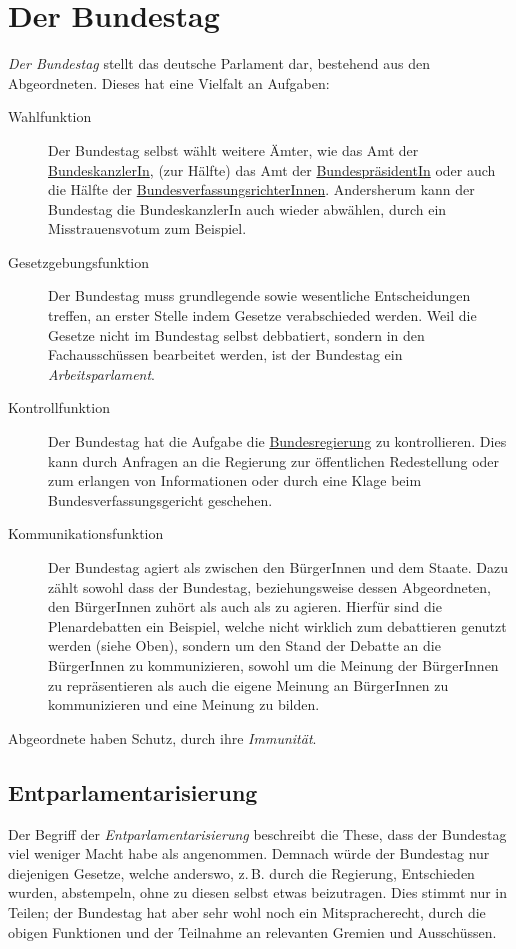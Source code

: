 \documentclass{article}
\begin{document}
\section{Der Bundestag}
\emph{Der Bundestag} stellt das deutsche Parlament dar, bestehend aus den Abgeordneten. Dieses hat eine Vielfalt an Aufgaben:
\begin{description}
 \item[Wahlfunktion] Der Bundestag selbst wählt weitere Ämter, wie das Amt der \hyperref[Die BundeskanzlerIn]{BundeskanzlerIn}, (zur Hälfte) das Amt der \hyperref[Die BundespräsidentIn]{BundespräsidentIn} oder auch die Hälfte der \hyperref[Das Bundesverfassungsgericht]{BundesverfassungsrichterInnen}. Andersherum kann der Bundestag die BundeskanzlerIn auch wieder abwählen, durch ein Misstrauensvotum zum Beispiel.
 \item[Gesetzgebungsfunktion] Der Bundestag muss grundlegende sowie wesentliche Entscheidungen treffen, an erster Stelle indem Gesetze verabschieded werden. Weil die Gesetze nicht im Bundestag selbst debbatiert, sondern in den Fachausschüssen bearbeitet werden, ist der Bundestag ein \emph{Arbeitsparlament}.
 \item[Kontrollfunktion] Der Bundestag hat die Aufgabe die \hyperref[Die Bundesregierung]{Bundesregierung} zu kontrollieren. Dies kann durch Anfragen an die Regierung zur öffentlichen Redestellung oder zum erlangen von Informationen oder durch eine Klage beim Bundesverfassungsgericht geschehen.
 \item[Kommunikationsfunktion] Der Bundestag agiert als  zwischen den BürgerInnen und dem Staate. Dazu zählt sowohl dass der Bundestag, beziehungsweise dessen Abgeordneten, den BürgerInnen zuhört als auch als  zu agieren. Hierfür sind die Plenardebatten ein Beispiel, welche nicht wirklich zum debattieren genutzt werden (siehe Oben), sondern um den Stand der Debatte an die BürgerInnen zu kommunizieren, sowohl um die Meinung der BürgerInnen zu repräsentieren als auch die eigene Meinung an BürgerInnen zu kommunizieren und eine Meinung zu bilden.
\end{description} 
 
Abgeordnete haben Schutz, durch ihre \emph{Immunität}.
 
\subsection{Entparlamentarisierung} 
Der Begriff der \emph{Entparlamentarisierung} beschreibt die These, dass der Bundestag viel weniger Macht habe als angenommen. Demnach würde der Bundestag nur diejenigen Gesetze, welche anderswo, z.\,B. durch die Regierung, Entschieden wurden, abstempeln, ohne zu diesen selbst etwas beizutragen. Dies stimmt nur in Teilen; der Bundestag hat aber sehr wohl noch ein Mitspracherecht, durch die obigen Funktionen und der Teilnahme an relevanten Gremien und Ausschüssen.
\end{document}
